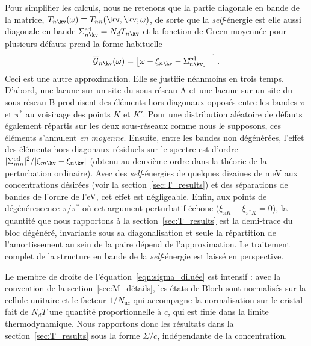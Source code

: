 Pour simplifier les calculs, nous ne retenons que la partie diagonale en bande de la matrice, $T_{n\kv}(\omega)\equiv T_{nn}(\kv,\kv;\omega)$, de sorte que la \textit{self}-énergie est elle aussi diagonale en bande $\Sigma^\text{ed}_{n\kv}=N_dT_{n\kv}$ et la fonction de Green moyennée pour plusieurs défauts prend la forme habituelle
\begin{equation}
    \overline{\mathcal{G}}_{n\kv}(\omega)=\left[\omega-\xi_{n\kv}-\Sigma^\text{ed}_{n\kv}\right]^{-1}.\label{eqn:G_moyenne_diag}
\end{equation}
Ceci est une autre approximation. Elle se justifie néanmoins en trois temps. D'abord, une lacune sur un site du sous-réseau A et une lacune sur un site du sous-réseau B produisent des éléments hors-diagonaux opposés entre les bandes $\pi$ et $\pi^*$ au voisinage des points $K$ et $K'$. Pour une distribution aléatoire de défauts également répartis sur les deux sous-réseaux comme nous le supposons, ces éléments s'annulent \textit{en moyenne}. Ensuite, entre les bandes non dégénérées, l'effet des éléments hors-diagonaux résiduels sur le spectre est d'ordre $|\Sigma^\text{ed}_{mn}|^2/|\xi_{m\kv}-\xi_{n\kv}|$ (obtenu au deuxième ordre dans la théorie de la perturbation ordinaire). Avec des \textit{self}-énergies de quelques dizaines de meV aux concentrations désirées (voir la section~\ref{sec:T_results}) et des séparations de bandes de l'ordre de l'eV, cet effet est négligeable. Enfin, aux points de dégénérescence $\pi/\pi^*$ où cet argument perturbatif échoue ($\xi_{\pi K}-\xi_{\pi^*K}=0$), la quantité que nous rapportons à la section~\ref{sec:T_results} est la demi-trace du bloc dégénéré, invariante sous sa diagonalisation et seule la répartition de l'amortissement au sein de la paire dépend de l'approximation. Le traitement complet de la structure en bande de la \textit{self}-énergie est laissé en perspective.

Le membre de droite de l'équation~\eqref{eqn:sigma_diluée} est intensif : avec la convention de la section~\ref{sec:M_détails}, les états de Bloch sont normalisés sur la cellule unitaire et le facteur $1/N_\text{uc}$ qui accompagne la normalisation sur le cristal fait de $N_dT$ une quantité proportionnelle à $c$, qui est finie dans la limite thermodynamique. Nous rapportons donc les résultats dans la section~\ref{sec:T_results} sous la forme $\Sigma/c$, indépendante de la concentration.

